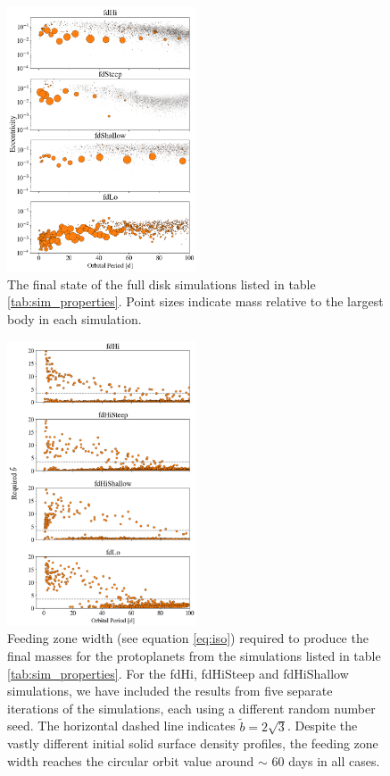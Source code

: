 \documentclass[twocolumn,linenumbers]{aastex63}
\begin{document}
\begin{figure}
\begin{center}
    \includegraphics[width=0.5\textwidth]{figures/surfden_profiles.png}
    \caption{The final state of the full disk simulations listed in table \ref{tab:sim_properties}. 
    Point sizes indicate mass relative to the largest body in each simulation.\label{fig:surfden_profiles}}
\end{center}
\end{figure}

\begin{figure}
\begin{center}
    \includegraphics[width=0.5\textwidth]{figures/surfden_b.png}
    \caption{Feeding zone width (see equation \ref{eq:iso}) required to produce the final masses for the protoplanets from the 
    simulations listed in table \ref{tab:sim_properties}. For the fdHi, fdHiSteep and fdHiShallow simulations, we have included the results from five separate iterations of the simulations, each using a different random number seed. The horizontal dashed line indicates $\tilde{b} = 2 \sqrt{3}$. Despite the 
    vastly different initial solid surface density profiles, the feeding zone width reaches the circular orbit value around $\sim$ 60 
    days in all cases. \label{fig:surfden_b}}
\end{center}
\end{figure}
\end{document}
